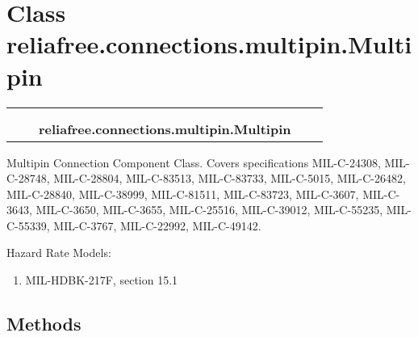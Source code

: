 %
%
%


\section{Class reliafree.connections.multipin.Multipin}

    \label{reliafree:connections:multipin:Multipin}
\begin{tabular}{cccccc}
\multicolumn{2}{r}{\settowidth{\BCL}{reliafree.connections.connection.Connection}\multirow{2}{\BCL}{reliafree.connections.connection.Connection}}
&&
  \\\cline{3-3}
  &&\multicolumn{1}{c|}{}
&&
  \\
&&\multicolumn{2}{l}{\textbf{reliafree.connections.multipin.Multipin}}
\end{tabular}

Multipin Connection Component Class. Covers specifications MIL-C-24308, 
MIL-C-28748, MIL-C-28804, MIL-C-83513, MIL-C-83733, MIL-C-5015, 
MIL-C-26482, MIL-C-28840, MIL-C-38999, MIL-C-81511, MIL-C-83723, 
MIL-C-3607, MIL-C-3643, MIL-C-3650, MIL-C-3655, MIL-C-25516, MIL-C-39012, 
MIL-C-55235, MIL-C-55339, MIL-C-3767, MIL-C-22992, MIL-C-49142.

Hazard Rate Models:

\begin{enumerate}

\setlength{\parskip}{0.5ex}
  \item MIL-HDBK-217F, section 15.1

\end{enumerate}



  \subsection{Methods}

